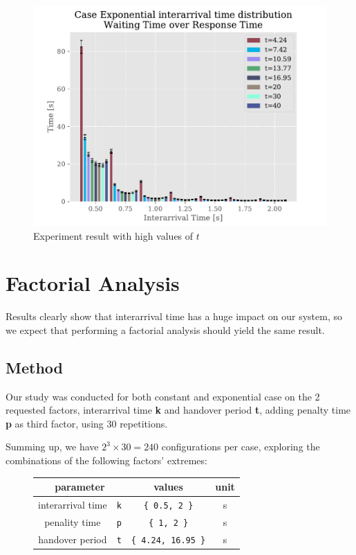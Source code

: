 \documentclass[a4paper,12pt]{article}
\begin{document}
\begin{figure}[H]
  \centering
  \includegraphics[width=.6\textwidth]{img/WaitingTimeOverResponseTimeHighT.pdf}
  \caption{Experiment result with high values of $t$}
  \label{fig:result-3}
\end{figure}

\section{Factorial Analysis}
Results clearly show that interarrival time has a huge impact on our system, so we expect that performing a factorial analysis should yield the same result.
\subsection{Method}
Our study was conducted for both constant and exponential case on the 2 requested factors, interarrival time \textbf{k} and handover period \textbf{t}, adding penalty time \textbf{p} as third factor, using 30 repetitions.

Summing up, we have $2^3 \times 30 = 240$ configurations per case, exploring the combinations of the following factors' extremes:

\begin{figure}[H]
  \centering
  \begin{tabular}{| c | c | c | c |}\hline
    \multicolumn{2}{|c|}{parameter} & values & unit \\ \hline
    interarrival time & \texttt{k} & \texttt{\{ 0.5, 2 \}} & s \\ \hline
    penality time & \texttt{p} & \texttt{\{ 1, 2 \}} & s \\ \hline
    handover period & \texttt{t} & \texttt{\{ 4.24, 16.95 \}} & s \\ \hline
  \end{tabular}
\end{figure}
\end{document}
